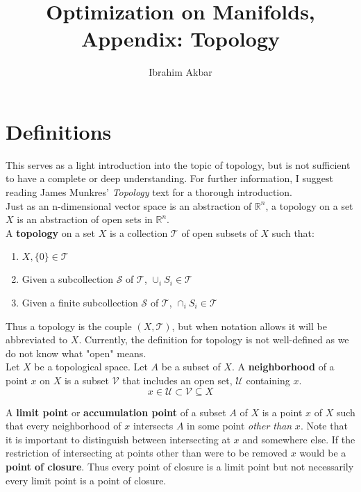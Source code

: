 \documentclass[a4paper]{article}
\begin{document}
\title{Optimization on Manifolds, Appendix: Topology}
\author{Ibrahim Akbar}
\maketitle

\section{Definitions}
This serves as a light introduction into the topic of topology, but is not sufficient to have a complete or deep understanding. For further information, I suggest reading James Munkres' \textit{Topology} text for a thorough introduction.\\

\noindent Just as an n-dimensional vector space is an abstraction of $\mathbb{R}^{n}$, a topology on a set $X$ is an abstraction of open sets in $\mathbb{R}^{n}$.\\

\noindent A \textbf{topology} on a set $X$ is a collection $\mathcal{T}$ of open subsets of $X$ such that:

\begin{enumerate}
\item $X,\{0\}\in\mathcal{T}$
\item Given a subcollection $\mathcal{S}$ of $\mathcal{T}$, $\cup_{i}S_{i}\in\mathcal{T}$
\item Given a finite subcollection $\mathcal{S}$ of $\mathcal{T}$, $\cap_{i}S_{i}\in\mathcal{T}$
\end{enumerate}

\noindent Thus a topology is the couple $(X,\mathcal{T})$, but when notation allows it will be abbreviated to $X$. Currently, the definition for topology is not well-defined as we do not know what "open" means.\\

\noindent Let $X$ be a topological space. Let $A$ be a subset of $X$. A \textbf{neighborhood} of a point $x$ on $X$ is a subset $\mathcal{V}$ that includes an open set, $\mathcal{U}$ containing $x$.
$$
x\in\mathcal{U}\subset\mathcal{V}\subseteq X
$$

\noindent A \textbf{limit point} or \textbf{accumulation point} of a subset $A$ of $X$ is a point $x$ of $X$ such that every neighborhood of $x$ intersects $A$ in some point \textit{other than} $x$. Note that it is important to distinguish between intersecting at $x$ and somewhere else. If the restriction of intersecting at points other than were to be removed $x$ would be a \textbf{point of closure}. Thus every point of closure is a limit point but not necessarily every limit point is a point of closure.\\
\end{document}
